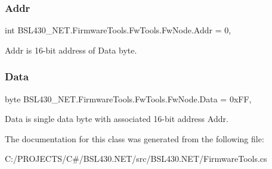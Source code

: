 \subsubsection{\texorpdfstring{Addr}{Addr}}
{\footnotesize\ttfamily int B\+S\+L430\+\_\+\+N\+E\+T.\+Firmware\+Tools.\+Fw\+Tools.\+Fw\+Node.\+Addr = 0\hspace{0.3cm}{\ttfamily [get]}, {\ttfamily [set]}}



Addr is 16-\/bit address of Data byte. 

\mbox{\label{class_b_s_l430___n_e_t_1_1_firmware_tools_1_1_fw_tools_1_1_fw_node_ad83b49ec9c18f1228debdc953e51c954}} 
\subsubsection{\texorpdfstring{Data}{Data}}
{\footnotesize\ttfamily byte B\+S\+L430\+\_\+\+N\+E\+T.\+Firmware\+Tools.\+Fw\+Tools.\+Fw\+Node.\+Data = 0x\+FF\hspace{0.3cm}{\ttfamily [get]}, {\ttfamily [set]}}



Data is single data byte with associated 16-\/bit address Addr. 



The documentation for this class was generated from the following file\+:\begin{DoxyCompactItemize}
\item 
C\+:/\+P\+R\+O\+J\+E\+C\+T\+S/\+C\#/\+B\+S\+L430.\+N\+E\+T/src/\+B\+S\+L430.\+N\+E\+T/Firmware\+Tools.\+cs\end{DoxyCompactItemize}
